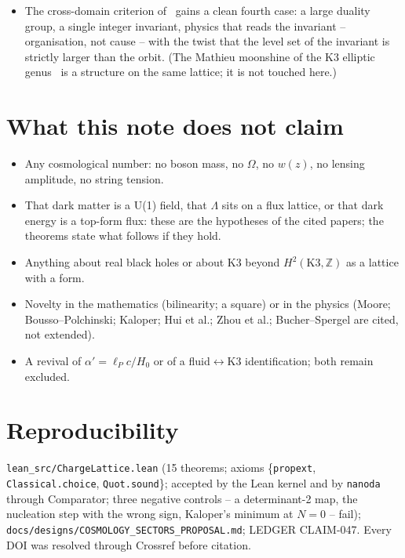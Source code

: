 \documentclass[11pt,a4paper]{article}
\newcommand{\lean}[1]{\texttt{\small #1}}
\begin{document}
\begin{itemize}[leftmargin=*]
  ``entropy is a function of the sector alone'' theorem is claimed. The historically prior two/three-charge
  Strominger--Vafa/Callan--Maldacena formula $S\sim2\pi\sqrt{Q_1Q_5n}$~\cite{StromingerVafa1996,
  CallanMaldacena1996} is explicitly excluded from this discriminant framework: $Q_1Q_5n$ is a product of three
  independent integers, not a quadratic-form discriminant, and the formula itself is a leading-order Cardy
  approximation, not exact.
\item The cross-domain criterion of~\cite{Callens2026Duality} gains a clean fourth case: a large duality group,
  a single integer invariant, physics that reads the invariant -- organisation, not cause -- with the twist that
  the level set of the invariant is strictly larger than the orbit. (The Mathieu moonshine of the K3 elliptic
  genus~\cite{EguchiOoguriTachikawa2011} is a structure on the same lattice; it is not touched here.)
\end{itemize}

\section{What this note does not claim}
\begin{failbox}
\begin{itemize}[leftmargin=*]
\item Any cosmological number: no boson mass, no $\Omega$, no $w(z)$, no lensing amplitude, no string tension.
\item That dark matter is a U(1) field, that $\Lambda$ sits on a flux lattice, or that dark energy is a top-form
  flux: these are the hypotheses of the cited papers; the theorems state what follows if they hold.
\item Anything about real black holes or about K3 beyond $H^2(\mathrm{K3},\mathbb Z)$ as a lattice with a form.
\item Novelty in the mathematics (bilinearity; a square) or in the physics (Moore; Bousso--Polchinski; Kaloper;
  Hui et al.; Zhou et al.; Bucher--Spergel are cited, not extended).
\item A revival of $\alpha'=\ell_Pc/H_0$ or of a fluid$\leftrightarrow$K3 identification; both remain excluded.
\end{itemize}
\end{failbox}

\section*{Reproducibility}
\lean{lean\_src/ChargeLattice.lean} (15 theorems; axioms \{\lean{propext}, \lean{Classical.choice},
\lean{Quot.sound}\}; accepted by the Lean kernel and by \lean{nanoda} through Comparator; three negative controls
-- a determinant-2 map, the nucleation step with the wrong sign, Kaloper's minimum at $N=0$ -- fail);
\lean{docs/designs/COSMOLOGY\_SECTORS\_PROPOSAL.md}; LEDGER CLAIM-047. Every DOI was resolved through Crossref
before citation.



\end{document}
